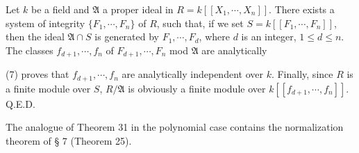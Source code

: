 Let $k$ be a field and $\mathfrak{A}$ a proper ideal in $R = k[[X_1, \cdots, X_n]]$. There exists a system of integrity $\{F_1, \cdots, F_n\}$ of $R$, such that, if we set $S = k[[F_1, \cdots, F_n]]$, then the ideal $\mathfrak{A} \cap S$ is generated by $F_1, \cdots, F_d$, where $d$ is an integer, $1 \leq d \leq n$. The classes $f_{d+1}, \cdots, f_n$ of $F_{d+1}, \cdots, F_n$ mod $\mathfrak{A}$ are analytically

(7) proves that $f_{d+1}, \cdots, f_n$ are analytically independent over $k$. Finally, since $R$ is a finite module over $S$, $R/\mathfrak{A}$ is obviously a finite module over $k[[f_{d+1}, \cdots, f_n]]$. Q.E.D.

The analogue of Theorem 31 in the polynomial case contains the normalization theorem of § 7 (Theorem 25).